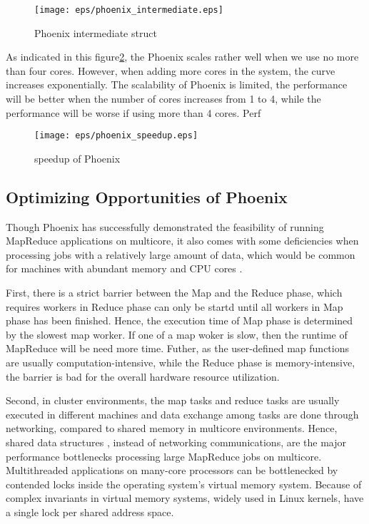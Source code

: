 \begin{figure}[!h!t]  
    \centering
    \texttt{[image: eps/phoenix\_intermediate.eps]}
    \caption{Phoenix intermediate struct}
    \label{fig:phoenix:intermediate}
\end{figure}

As indicated in this figure\ref{fig:phoenix:speedup}, 
the Phoenix scales rather well when we use no more than four cores. 
However, when adding more cores in the system, 
the curve increases exponentially. 
The scalability of Phoenix is limited, the performance will be
better when the number of cores increases from 1 to 4, 
while the performance will be worse if using more than 4 cores. 
Perf\cite{} 


\begin{figure}[!h!t]  
    \centering
    \texttt{[image: eps/phoenix\_speedup.eps]}
    \caption{speedup of Phoenix}
    \label{fig:phoenix:speedup}
\end{figure}


\subsection{Optimizing Opportunities of Phoenix}
Though Phoenix has successfully demonstrated the feasibility
of running MapReduce applications on multicore, 
it also comes with some deficiencies 
{\color{gray}when processing jobs with a relatively large
amount of data, which would be common for machines with abundant memory and CPU cores
}.

First, there is a strict barrier between the Map and the Reduce phase, 
which requires workers in Reduce phase can only 
be startd until all workers in Map phase has been finished. 
Hence, the execution time of Map phase is determined by the slowest map worker.
If one of a map woker is slow, then the runtime of MapReduce will be need more time.
Futher, as the user-defined map functions are usually computation-intensive,
while the Reduce phase is memory-intensive,
the barrier is bad for the overall hardware resource utilization.


Second, in cluster environments, 
the map tasks and reduce tasks are usually 
executed in different machines and data exchange among
tasks are done through networking, 
compared to shared memory in multicore environments. 
Hence, shared data structures , 
instead of networking communications, 
are the major performance bottlenecks processing large MapReduce jobs on multicore.
Multithreaded applications on many-core processors can be
bottlenecked by contended locks inside the operating system’s
virtual memory system. 
Because of complex invariants in virtual memory systems, 
widely used in Linux kernels, 
have a single lock per shared address space. 
\cite{clements2013radixvm}


